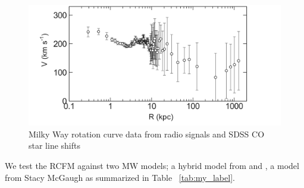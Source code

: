 \documentclass[reprint,%
 amsmath,amssymb,
 aps,
]{revtex4-1}
\begin{document}
 \begin{figure}
    \centering
    \includegraphics[width=\linewidth]{Sofue_MWtoLGData}
    \caption{Milky Way rotation curve data from radio signals and SDSS CO star line shifts  \cite{Sof11}}
    \label{fig:mwSofue}
\end{figure}



  We test the RCFM against two MW models;  a hybrid model from \citet{Xue} and \citet{Sofue}, a model from Stacy McGaugh  as summarized in Table ~\ref{tab:my_label}.
  
  
\end{document}
